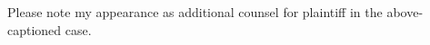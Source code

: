\documentclass[NY-SD,motion,sign]{litigation}
\begin{document}
\Caption

Please note my appearance as additional counsel for plaintiff in the
above-captioned case.

\FullSignature

\CertificateOfService
\end{document}
